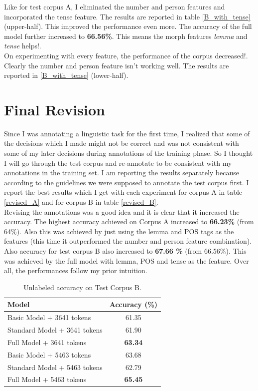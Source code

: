 \documentclass[11pt,letterpaper]{article}
\begin{document}
Like for test corpus A, I eliminated the number and person features and incorporated the tense feature. The results are reported in table \ref{B_with_tense} (upper-half). This improved the performance even more. The accuracy of the full model further increased to \textbf{66.56\%}. This means the morph features \textit{lemma} and \textit{tense} helps!.\\

On experimenting with every feature, the performance of the corpus decreased!. Clearly the number and person feature isn't working well. The results are reported in \ref{B_with_tense} (lower-half). 

\section{Final Revision}

Since I was annotating a linguistic task for the first time, I realized that some of the decisions which I made might not be correct and was not consistent with some of my later decisions during annotations of the training phase. So I thought I will go through the test corpus and re-annotate to be consistent with my annotations in the training set. I am reporting the results separately because according to the guidelines we were supposed to annotate the test corpus first. I report the best results which I get with each experiment for corpus A in  table \ref{revised_A} and for corpus B in table \ref{revised_B}.\\

Revising the annotations was a good idea and it is clear that it increased the accuracy. The highest accuracy achieved on Corpus A increased to \textbf{66.23\%} (from 64\%). Also this was achieved by just using the lemma and POS tags as the features (this time it outperformed the number and person feature combination). Also accuracy for test corpus B also increased to \textbf{67.66 \%} (from 66.56\%). This was achieved by the full model with lemma, POS and tense as the feature. Over all, the performances follow my prior intuition.


\begin{table}
\begin{center}
  \begin{tabular}{ l || c }
  \hline
  Model & Accuracy (\%)\\
  \hline
  Basic Model + 3641 tokens & 61.35 \\
  Standard Model + 3641 tokens & 61.90 \\
  Full Model + 3641 tokens & \textbf{63.34} \\
  \hline
  Basic Model + 5463 tokens & 63.68 \\
  Standard Model + 5463 tokens & 62.79 \\
  Full Model + 5463 tokens & \textbf{65.45}\\
  \hline
   \end{tabular}
\end{center}
\caption{Unlabeled accuracy on Test Corpus B.}
\label{Four}
\end{table}
\end{document}
